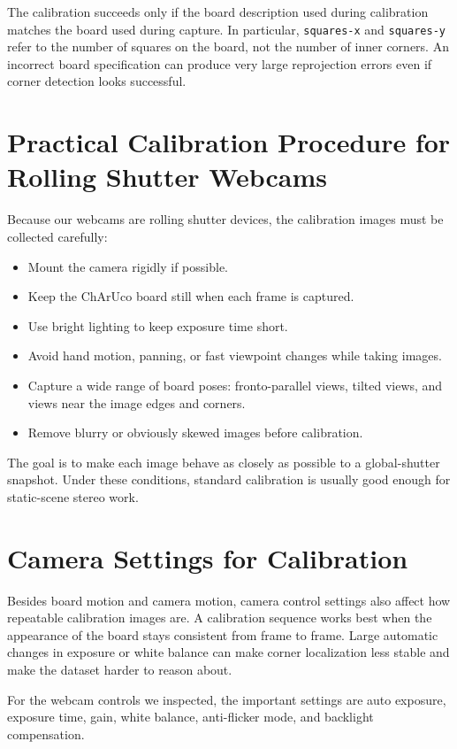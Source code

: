 \documentclass[11pt]{article}
\begin{document}
The calibration succeeds only if the board description used during
calibration matches the board used during capture. In particular,
\texttt{squares-x} and \texttt{squares-y} refer to the number of squares on
the board, not the number of inner corners. An incorrect board specification
can produce very large reprojection errors even if corner detection looks
successful.

\section{Practical Calibration Procedure for Rolling Shutter Webcams}

Because our webcams are rolling shutter devices, the calibration images must
be collected carefully:

\begin{itemize}
\item Mount the camera rigidly if possible.
\item Keep the ChArUco board still when each frame is captured.
\item Use bright lighting to keep exposure time short.
\item Avoid hand motion, panning, or fast viewpoint changes while taking
      images.
\item Capture a wide range of board poses: fronto-parallel views, tilted
      views, and views near the image edges and corners.
\item Remove blurry or obviously skewed images before calibration.
\end{itemize}

The goal is to make each image behave as closely as possible to a
global-shutter snapshot. Under these conditions, standard calibration is
usually good enough for static-scene stereo work.

\section{Camera Settings for Calibration}

Besides board motion and camera motion, camera control settings also affect
how repeatable calibration images are. A calibration sequence works best when
the appearance of the board stays consistent from frame to frame. Large
automatic changes in exposure or white balance can make corner localization
less stable and make the dataset harder to reason about.

For the webcam controls we inspected, the important settings are auto
exposure, exposure time, gain, white balance, anti-flicker mode, and
backlight compensation.
\end{document}
